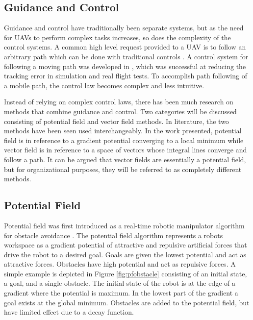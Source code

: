 \documentclass[numbered,pdftex]{ohio-etd}
\begin{document}
\subsection{Guidance and Control}

Guidance and control have traditionally been separate systems, but as the need for UAVs to perform complex tasks increases, so does the complexity of the control systems. A common high level request provided to a UAV is to follow an arbitrary path which can be done with traditional controls \cite{zhao_curved_2017}. A control system for following a moving path was developed in \cite{oliveira_moving_2016}, which was successful at reducing the tracking error in simulation and real flight tests. To accomplish path following of a mobile path, the control law becomes complex and less intuitive. 

Instead of relying on complex control laws, there has been much research on methods that combine guidance and control.  Two categories will be discussed consisting of potential field and vector field methods. In literature, the two methods have been seen used interchangeably. In the work presented, potential field is in reference to a gradient potential converging to a local minimum while vector field is in reference to a space of vectors whose integral lines converge and follow a path. It can be argued that vector fields are essentially a potential field, but for organizational purposes, they will be referred to as completely different methods. 

\subsection{Potential Field}


 Potential field was first introduced as a real-time robotic manipulator algorithm for obstacle avoidance \cite{khatib_real-time_1986}. The potential field algorithm represents a robots workspace as a gradient potential of attractive and repulsive artificial forces that drive the robot to a desired goal. Goals are given the lowest potential and act as attractive forces. Obstacles have high potential and act as repulsive forces. A simple example is depicted in Figure \ref{fig:pfobstacle} consisting of an initial state, a goal, and a single obstacle. The initial state of the robot is at the edge of a gradient where the potential is maximum. In the lowest part of the gradient a goal exists at the global minimum. Obstacles are added to the potential field, but have limited effect due to a decay function.
\end{document}
